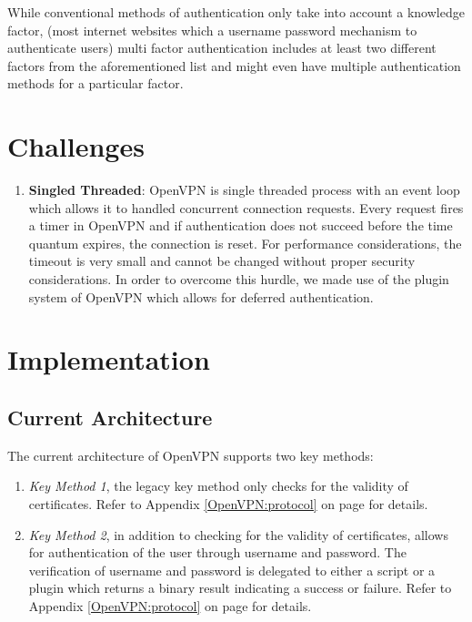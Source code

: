 \documentclass[11pt,oneside]{book}
\begin{document}
While conventional methods of authentication only take into account a knowledge factor,
(most internet websites which a username password mechanism to authenticate users)
multi factor authentication includes at least two different factors from the aforementioned
list and might even have multiple authentication methods for a particular factor.

\section{Challenges}
\begin{enumerate}
    \item \textbf{Singled Threaded}: OpenVPN is single threaded process with an event loop which
        allows it to handled concurrent connection requests. Every request fires a timer in OpenVPN
        and if authentication does not succeed before the time quantum expires, the connection is
        reset. For performance considerations, the timeout is very small and cannot be changed
        without proper security considerations. In order to overcome this hurdle, we made use
        of the plugin system of OpenVPN which allows for deferred authentication.
\end{enumerate}

\section{Implementation}
\subsection{Current Architecture}
The current architecture of OpenVPN supports two key methods:

\begin{enumerate}
    \item \emph{Key Method 1}, the legacy key method only checks for the validity of certificates.
        Refer to Appendix \ref{OpenVPN:protocol} on page \pageref{OpenVPN:protocol} for details.
    \item \emph{Key Method 2}, in addition to checking for the validity of certificates, allows for
        authentication of the user through username and password. The verification of username and
        password is delegated to either a script or a plugin which returns a binary result
        indicating a success or failure.
        Refer to Appendix \ref{OpenVPN:protocol} on page \pageref{OpenVPN:protocol} for details.
\end{enumerate}
\end{document}
